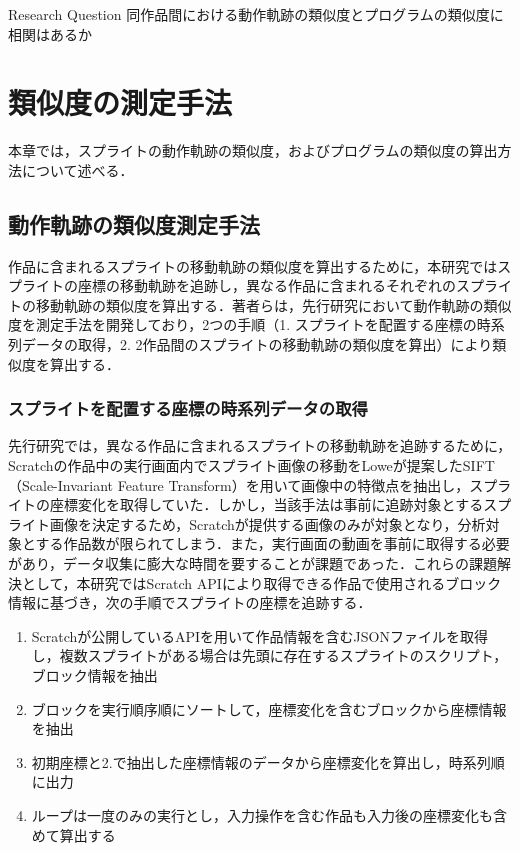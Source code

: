 \documentclass[T,J]{fose} %
\begin{document}
\begin{itembox}[l]{Research Question}
同作品間における動作軌跡の類似度とプログラムの類似度に相関はあるか
\end{itembox}

\section{類似度の測定手法}\label{sec:Similarity}

本章では，スプライトの動作軌跡の類似度，およびプログラムの類似度の算出方法について述べる．

\subsection{動作軌跡の類似度測定手法}\label{subsec:Similarity movement measurement}

作品に含まれるスプライトの移動軌跡の類似度を算出するために，本研究ではスプライトの座標の移動軌跡を追跡し，異なる作品に含まれるそれぞれのスプライトの移動軌跡の類似度を算出する．著者らは，先行研究\cite{}において動作軌跡の類似度を測定手法を開発しており，2つの手順（1. スプライトを配置する座標の時系列データの取得，2. 2作品間のスプライトの移動軌跡の類似度を算出）により類似度を算出する．

\subsubsection{スプライトを配置する座標の時系列データの取得}

先行研究\cite{}では，異なる作品に含まれるスプライトの移動軌跡を追跡するために，Scratchの作品中の実行画面内でスプライト画像の移動をLoweが提案したSIFT（Scale-Invariant Feature Transform）を用いて画像中の特徴点を抽出し，スプライトの座標変化を取得していた．しかし，当該手法は事前に追跡対象とするスプライト画像を決定するため，Scratchが提供する画像のみが対象となり，分析対象とする作品数が限られてしまう．また，実行画面の動画を事前に取得する必要があり，データ収集に膨大な時間を要することが課題であった．これらの課題解決として，本研究ではScratch APIにより取得できる作品で使用されるブロック情報に基づき，次の手順でスプライトの座標を追跡する．
\begin{enumerate}
    \item Scratchが公開しているAPIを用いて作品情報を含むJSONファイルを取得し，複数スプライトがある場合は先頭に存在するスプライトのスクリプト，ブロック情報を抽出
    \item ブロックを実行順序順にソートして，座標変化を含むブロックから座標情報を抽出
    \item 初期座標と2.で抽出した座標情報のデータから座標変化を算出し，時系列順に出力
    \item ループは一度のみの実行とし，入力操作を含む作品も入力後の座標変化も含めて算出する
\end{enumerate}
\end{document}
